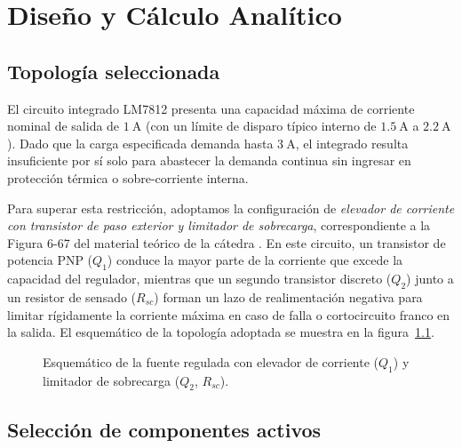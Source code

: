 \chapter{Diseño y Cálculo Analítico}
\label{sec.c5:diseno_teorico}

\section{Topología seleccionada}
\label{sec.c5:topologia}

El circuito integrado LM7812 presenta una capacidad máxima de corriente nominal de salida de $\SI{1}{\ampere}$
(con un límite de disparo típico interno de $\SI{1.5}{\ampere}$ a $\SI{2.2}{\ampere}$). Dado que la carga
especificada demanda hasta $\SI{3}{\ampere}$, el integrado resulta insuficiente por sí solo para abastecer la
demanda continua sin ingresar en protección térmica o sobre-corriente interna.

Para superar esta restricción, adoptamos la configuración de \emph{elevador de corriente con transistor de paso
exterior y limitador de sobrecarga}, correspondiente a la Figura 6-67 del material teórico de la cátedra
\cite{gonzalez_fuentes3}. En este circuito, un transistor de potencia PNP ($Q_1$) conduce la mayor parte de la
corriente que excede la capacidad del regulador, mientras que un segundo transistor discreto ($Q_2$) junto a un resistor
de sensado ($R_{sc}$) forman un lazo de realimentación negativa para limitar rígidamente la corriente máxima
en caso de falla o cortocircuito franco en la salida.
El esquemático de la topología adoptada se muestra en la figura~\ref{fig.c5:esquematico_tikz}.

\begin{figure}[H]
    \centering
    \resizebox{\textwidth}{!}{}
    \caption{Esquemático de la fuente regulada con elevador de corriente ($Q_1$) y limitador de sobrecarga ($Q_2$, $R_{sc}$).}
    \label{fig.c5:esquematico_tikz}
\end{figure}

\section{Selección de componentes activos}
\label{sec.c5:seleccion_activos}

